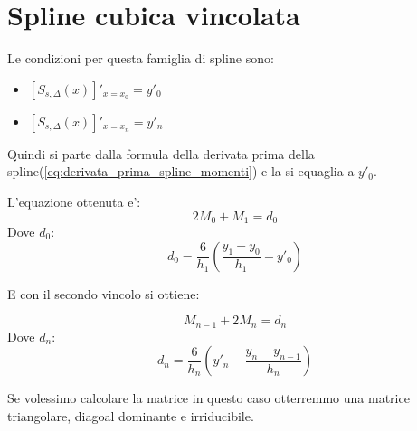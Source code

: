 \section{Spline cubica vincolata}
Le condizioni per questa famiglia di spline sono:
\begin{itemize}
  \item $[S_{s, \Delta}(x)]'_{x=x_0} = y'_0$
  \item $[S_{s, \Delta}(x)]'_{x=x_n} = y'_n$
\end{itemize}

Quindi si parte dalla formula della derivata prima della spline(\ref{eq:derivata_prima_spline_momenti})  e la si equaglia a $y'_0$.

L'equazione ottenuta e':
\begin{equation}
  2M_0 + M_1 = d_0
\end{equation}
Dove $d_0$:
\begin{equation}
  d_0 = \frac{6}{h_1}(\frac{y_1-y_0}{h_1} - y'_0)
\end{equation}

E con il secondo vincolo si ottiene:

\begin{equation}
  M_{n-1} + 2M_n = d_n
\end{equation}
Dove $d_n$:
\begin{equation}
  d_n = \frac{6}{h_n}( y'_n - \frac{y_n-y_{n-1}}{h_n})
\end{equation}

Se volessimo calcolare la matrice in questo caso otterremmo una matrice triangolare, diagoal dominante e irriducibile.


